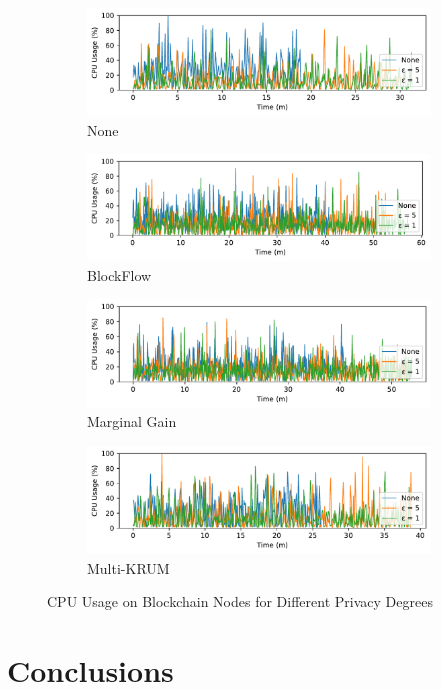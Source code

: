 \begin{figure}[!ht]
    \centering
    \begin{subfigure}[b]{0.49\textwidth}
        \centering
        \includegraphics[width=\textwidth]{graphics/05_priv_cpu_none_miner.pdf}
        \caption{None}
    \end{subfigure}
    \hfill
    \begin{subfigure}[b]{0.49\textwidth}
        \centering
        \includegraphics[width=\textwidth]{graphics/05_priv_cpu_blockflow_miner.pdf}
        \caption{BlockFlow}
    \end{subfigure}
    \hfill
    \begin{subfigure}[b]{0.49\textwidth}
        \centering
        \includegraphics[width=\textwidth]{graphics/05_priv_cpu_marginalgain_miner.pdf}
        \caption{Marginal Gain}
    \end{subfigure}
    \hfill
    \begin{subfigure}[b]{0.49\textwidth}
        \centering
        \includegraphics[width=\textwidth]{graphics/05_priv_cpu_multikrum_miner.pdf}
        \caption{Multi-KRUM}
    \end{subfigure}
    \caption{CPU Usage on Blockchain Nodes for Different Privacy Degrees}
    \label{fig:cpu_priv_degree_miner}
\end{figure}

\section{Conclusions} %
